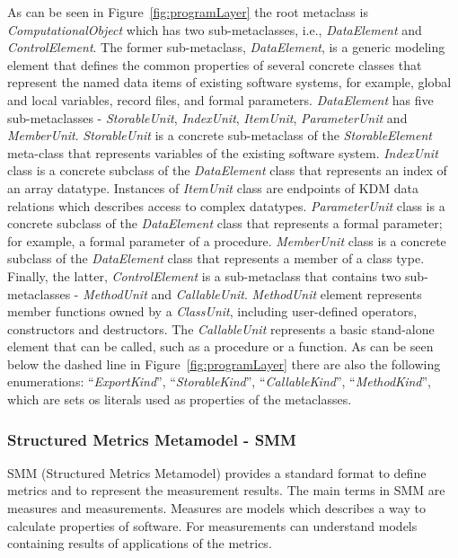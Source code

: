 As can be seen in Figure~\ref{fig:programLayer} the root metaclass is \textit{ComputationalObject} which has two sub-metaclasses, i.e., \textit{DataElement} and \textit{ControlElement}. The former sub-metaclass, \textit{DataElement}, is a generic modeling element that defines the common properties of several concrete classes that represent the named data items of existing software systems, for example, global and local variables, record files, and formal parameters. \textit{DataElement} has five sub-metaclasses - \textit{StorableUnit}, \textit{IndexUnit}, \textit{ItemUnit}, \textit{ParameterUnit} and \textit{MemberUnit}. \textit{StorableUnit} is a concrete  sub-metaclass of the \textit{StorableElement} meta-class that represents variables of the existing software system. \textit{IndexUnit} class is a concrete subclass of the \textit{DataElement} class that represents an index of an array datatype. Instances of \textit{ItemUnit} class are endpoints of KDM data relations which describes access to complex datatypes. \textit{ParameterUnit} class is a concrete subclass of the \textit{DataElement} class that represents a formal parameter; for example, a formal parameter of a procedure. \textit{MemberUnit} class is a concrete subclass of the \textit{DataElement} class that represents a member of a class type. Finally, the latter, \textit{ControlElement} is a sub-metaclass that contains two sub-metaclasses - \textit{MethodUnit} and \textit{CallableUnit}. \textit{MethodUnit} element represents member functions owned by a \textit{ClassUnit}, including user-defined operators, constructors and destructors. The \textit{CallableUnit} represents a basic stand-alone element that can be called, such as a procedure or a function. As can be seen below the dashed line in Figure~\ref{fig:programLayer} there are also the following enumerations: ``\textit{ExportKind}'', ``\textit{StorableKind}'', ``\textit{CallableKind}'', ``\textit{MethodKind}'', which are sets os literals used as properties of the metaclasses.

\subsubsection{Structured Metrics Metamodel - SMM}

SMM (Structured Metrics Metamodel) provides a standard format to define metrics and to represent the measurement results. The main terms in SMM are measures and measurements. Measures are models which describes a way to calculate properties of software. For measurements can understand models containing results of applications of the metrics.

